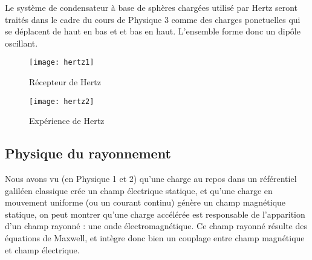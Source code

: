 Le système de condensateur à base de sphères chargées utilisé par Hertz seront traités dans le cadre du cours de Physique 3 comme des charges ponctuelles qui se déplacent de haut en bas et et bas en haut. L'ensemble forme donc un dipôle oscillant.
\begin{figure}[h]
	\begin{minipage}[l]{.5\linewidth}\centering
		\texttt{[image: hertz1]}
		\caption{Récepteur de Hertz}
	\end{minipage}
	\begin{minipage}[]{.5\linewidth}\centering
		\texttt{[image: hertz2]}
		\label{fig:expHertz}
		\caption{Expérience de Hertz} 
	\end{minipage}
\end{figure}

\subsection{Physique du rayonnement}
Nous avons vu (en Physique 1 et 2) qu'une charge au repos dans un référentiel galiléen classique crée un champ électrique statique, et qu'une charge en mouvement uniforme (ou un courant continu) génère un champ magnétique statique, on peut montrer qu'une charge accélérée est responsable de l'apparition d'un champ rayonné : une onde électromagnétique. Ce champ rayonné résulte des équations de Maxwell, et intègre donc bien un couplage entre champ magnétique et champ électrique.

